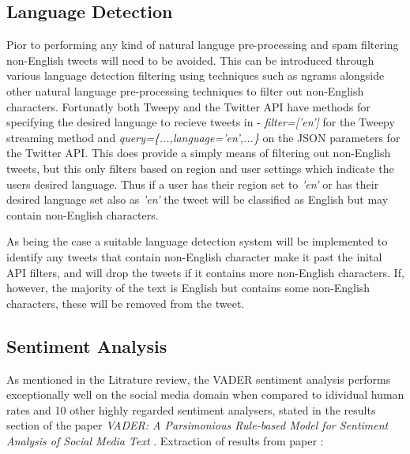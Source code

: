 \documentclass[oneside, 10pt]{article}
\begin{document}
		
		\subsection{Language Detection}
		Pior to performing any kind of natural languge pre-processing and spam filtering non-English tweets will need to be avoided. This can be introduced through various language detection filtering using techniques such as ngrams alongside other natural language pre-processing techniques to filter out non-English characters. Fortunatly both Tweepy and the Twitter API have methods for specifying the desired language to recieve tweets in - \textit{filter=['en']} for the Tweepy streaming method and \textit{query=\{...,language='en',...\}} on the JSON parameters for the Twitter API. This does provide a simply means of filtering out non-English tweets, but this only filters based on region and user settings which indicate the users desired language. Thus if a user has their region set to \textit{'en'} or has their desired language set also as \textit{'en'} the tweet will be classified as English but may contain non-English characters. 
		
		As being the case a suitable language detection system will be implemented to identify any tweets that contain non-English character make it past the inital API filters, and will drop the tweets if it contains more non-English characters. If, however, the majority of the text is English but contains some non-English characters, these will be removed from the tweet.
		
		\subsection{Sentiment Analysis}
		As mentioned in the Litrature review, the VADER sentiment analysis performs exceptionally well on the social media domain when compared to idividual human rates and 10 other highly regarded sentiment analysers, stated in the results section of the paper \textit{VADER: A Parsimonious Rule-based Model for Sentiment Analysis of Social Media Text} \cite{12}. \newline Extraction of results from paper \cite{12}:
\end{document}
